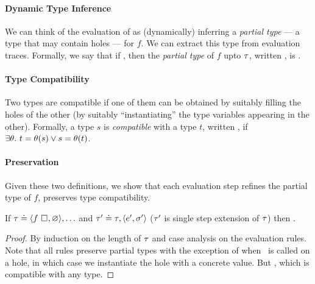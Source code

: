 \paragraph{Dynamic Type Inference}
We can think of the evaluation of  as (dynamically)
inferring a \emph{partial type} --- a type that may contain holes ---
for $f$.
%
We can extract this type from evaluation traces.
%
Formally, we say that if ,
then the \emph{partial type} of $f$ upto $\tau$, written ,
is .
%

\paragraph{Type Compatibility}
Two types are compatible if one of them can be obtained by
suitably filling the holes of the other (\ie by suitably ``instantiating''
the type variables appearing in the other). Formally, a type $s$ is
\emph{compatible} with a type $t$, written , if
$\exists \theta.\ t = \theta(s) \lor s = \theta(t)$.

\paragraph{Preservation}
Given these two definitions, we show that each evaluation step
refines the partial type of $f$, \ie preserves type compatibility.
%
\begin{lem}
\label{lem:refine-partial}
If $\tau \doteq \langle f \ \square_{}, \varnothing \rangle,\ldots$ and
$\tau' \doteq \tau, \langle e', \sigma' \rangle$ (\ie $\tau'$ is single
step extension of $\tau$)
%
%
then .
\end{lem}
\begin{proof}
  By induction on the length of $\tau$ and case analysis on the evaluation rules.
  Note that all rules preserve partial types with the exception of when
  \forcesym\ is called on a hole, in which case we instantiate the hole with
  a concrete value.
  But \hastype{\ehole{}}{\thole{}}, which is compatible with any type.
\end{proof}

